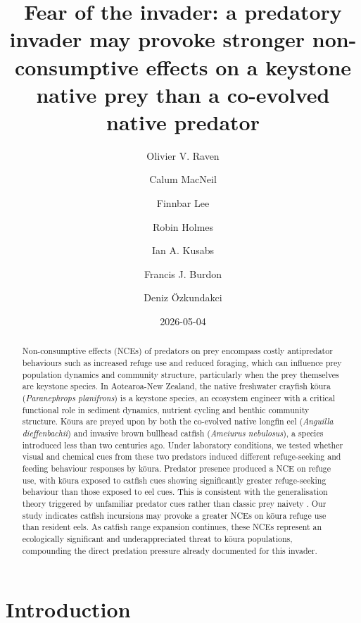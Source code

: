 \documentclass[
  letterpaper,
  DIV=11,
  numbers=noendperiod]{scrartcl}
\title{Fear of the invader: a predatory invader may provoke stronger
non-consumptive effects on a keystone native prey than a co-evolved
native predator}
\author{Olivier V. Raven \and Calum MacNeil \and Finnbar Lee \and Robin
Holmes \and Ian A. Kusabs \and Francis J. Burdon \and Deniz Özkundakci}
\date{2026-05-04}
\renewcommand*\contentsname{Table of contents}
\newcommand\contentsname{Table of contents}
\begin{document}
\maketitle
\begin{abstract}
Non-consumptive effects (NCEs) of predators on prey encompass costly
antipredator behaviours such as increased refuge use and reduced
foraging, which can influence prey population dynamics and community
structure, particularly when the prey themselves are keystone species.
In Aotearoa-New Zealand, the native freshwater crayfish kōura
(\emph{Paranephrops planifrons}) is a keystone species, an ecosystem
engineer with a critical functional role in sediment dynamics, nutrient
cycling and benthic community structure. Kōura are preyed upon by both
the co-evolved native longfin eel (\emph{Anguilla dieffenbachii}) and
invasive brown bullhead catfish (\emph{Ameiurus nebulosus}), a species
introduced less than two centuries ago. Under laboratory conditions, we
tested whether visual and chemical cues from these two predators induced
different refuge-seeking and feeding behaviour responses by kōura.
Predator presence produced a NCE on refuge use, with kōura exposed to
catfish cues showing significantly greater refuge-seeking behaviour than
those exposed to eel cues. This is consistent with the generalisation
theory triggered by unfamiliar predator cues rather than classic prey
naivety . Our study indicates catfish incursions may provoke a greater
NCEs on kōura refuge use than resident eels. As catfish range expansion
continues, these NCEs represent an ecologically significant and
underappreciated threat to kōura populations, compounding the direct
predation pressure already documented for this invader.
\end{abstract}

\renewcommand*\contentsname{Table of contents}
{
\setcounter{tocdepth}{3}
\tableofcontents
}

\section{Introduction}\label{introduction}
\end{document}
